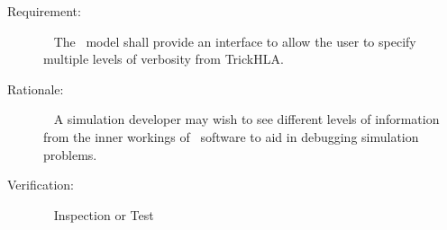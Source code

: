 \documentclass[twoside,11pt,titlepage]{report}
\begin{document}
\label{reqt:multiple_verbosity_levels}
\begin{description}
  \item[Requirement:]\ \newline
    The \TrickHLA\ model shall provide an interface to allow the user to
    specify multiple levels of verbosity from TrickHLA.

  \item[Rationale:]\ \newline
    A simulation developer may wish to see different levels of information from
    the inner workings of \TrickHLA\ software to aid in debugging simulation
    problems.

  \item[Verification:]\ \newline
    Inspection or Test
\end{description}


\newpage
{}


\end{document}

